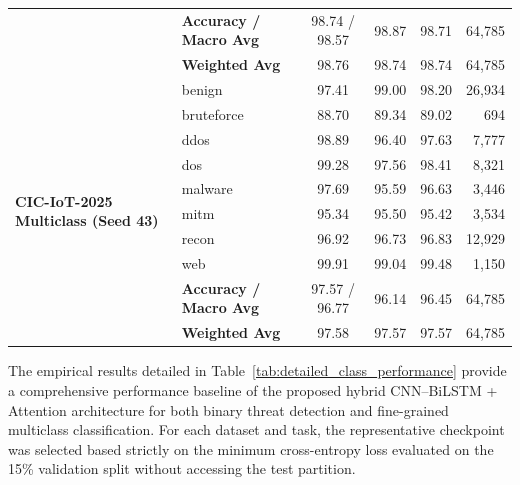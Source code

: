 \documentclass[a4paper,fleqn]{cas-sc}
\begin{document}
{\begin{longtable}{llcccr}
 & \textbf{Accuracy / Macro Avg} & 98.74 / 98.57 & 98.87 & 98.71 & 64,785 \\
 & \textbf{Weighted Avg} & 98.76 & 98.74 & 98.74 & 64,785 \\
\midrule
\multirow{10}{*}{\textbf{CIC-IoT-2025 Multiclass (Seed 43)}} & benign & 97.41 & 99.00 & 98.20 & 26,934 \\
 & bruteforce & 88.70 & 89.34 & 89.02 & 694 \\
 & ddos & 98.89 & 96.40 & 97.63 & 7,777 \\
 & dos & 99.28 & 97.56 & 98.41 & 8,321 \\
 & malware & 97.69 & 95.59 & 96.63 & 3,446 \\
 & mitm & 95.34 & 95.50 & 95.42 & 3,534 \\
 & recon & 96.92 & 96.73 & 96.83 & 12,929 \\
 & web & 99.91 & 99.04 & 99.48 & 1,150 \\
 & \textbf{Accuracy / Macro Avg} & 97.57 / 96.77 & 96.14 & 96.45 & 64,785 \\
 & \textbf{Weighted Avg} & 97.58 & 97.57 & 97.57 & 64,785 \\
\bottomrule
\end{longtable}
}

The empirical results detailed in Table~\ref{tab:detailed_class_performance} provide a comprehensive performance baseline of the proposed hybrid CNN--BiLSTM + Attention architecture for both binary threat detection and fine-grained multiclass classification. For each dataset and task, the representative checkpoint was selected based strictly on the minimum cross-entropy loss evaluated on the 15\% validation split without accessing the test partition.
\end{document}

